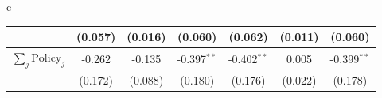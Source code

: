 \documentclass{beamer}
\def\bcolor{\color{green}}
\def\pcolor{\color{blue}}
\renewcommand{\to}{{\rightarrow}}
\begin{document}
\begin{frame}
\begin{table}
\begin{minipage}{\linewidth}
\begin{tabular}{c}
\begin{tabular}{lccc|c|cc}
 & (0.057) & (0.016) & (0.060) & (0.062) & (0.011) & (0.060)\\ \midrule
$\sum_j \mathrm{Policy}_j$ & -0.262 & -0.135 & -0.397$^{**}$ & -0.402$^{**}$ & 0.005 & -0.399$^{**}$\\
 & (0.172) & (0.088) & (0.180) & (0.176) & (0.022) & (0.178)\\
\bottomrule
\end{tabular}
    \\
  \end{tabular}
  \end{minipage}
\end{table}
\end{frame}
\end{document}
